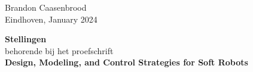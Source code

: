 \documentclass[a5paper]{article}
\renewcommand{\normalsize}{\fontsize{9}{9}\selectfont}
\newcommand{\largesize}{\fontsize{10}{9}\selectfont}
\begin{document}
\vspace{3mm}
\vfill
\begin{flushright}
Brandon Caasenbrood \\[0.15em]
Eindhoven, January 2024
\end{flushright} 

\begin{center}
\textcolor{black}{
}
\end{center}

\clearpage

\begin{center}
\largesize \textbf{Stellingen} \\[0.45em]
\normalsize behorende bij het proefschrift \\[0.45em]
{\textbf{\largesize Design, Modeling, and Control Strategies for Soft Robots}}
\end{center}
\end{document}
